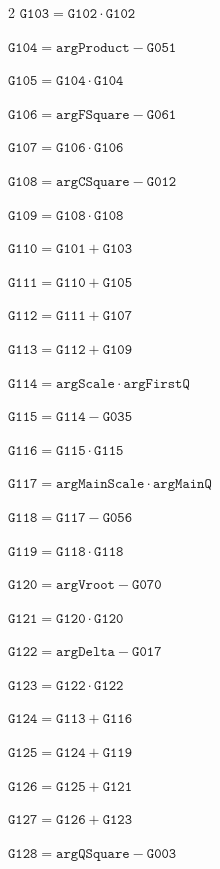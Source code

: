 \documentclass[10pt]{article}
\begin{document}
\begin{multicols}{2}
\noindent $\mathtt{G103}=\mathtt{G102}\cdot \mathtt{G102}$\par
\noindent $\mathtt{G104}=\mathtt{argProduct}-\mathtt{G051}$\par
\noindent $\mathtt{G105}=\mathtt{G104}\cdot \mathtt{G104}$\par
\noindent $\mathtt{G106}=\mathtt{argFSquare}-\mathtt{G061}$\par
\noindent $\mathtt{G107}=\mathtt{G106}\cdot \mathtt{G106}$\par
\noindent $\mathtt{G108}=\mathtt{argCSquare}-\mathtt{G012}$\par
\noindent $\mathtt{G109}=\mathtt{G108}\cdot \mathtt{G108}$\par
\noindent $\mathtt{G110}=\mathtt{G101}+\mathtt{G103}$\par
\noindent $\mathtt{G111}=\mathtt{G110}+\mathtt{G105}$\par
\noindent $\mathtt{G112}=\mathtt{G111}+\mathtt{G107}$\par
\noindent $\mathtt{G113}=\mathtt{G112}+\mathtt{G109}$\par
\noindent $\mathtt{G114}=\mathtt{argScale}\cdot \mathtt{argFirstQ}$\par
\noindent $\mathtt{G115}=\mathtt{G114}-\mathtt{G035}$\par
\noindent $\mathtt{G116}=\mathtt{G115}\cdot \mathtt{G115}$\par
\noindent $\mathtt{G117}=\mathtt{argMainScale}\cdot \mathtt{argMainQ}$\par
\noindent $\mathtt{G118}=\mathtt{G117}-\mathtt{G056}$\par
\noindent $\mathtt{G119}=\mathtt{G118}\cdot \mathtt{G118}$\par
\noindent $\mathtt{G120}=\mathtt{argVroot}-\mathtt{G070}$\par
\noindent $\mathtt{G121}=\mathtt{G120}\cdot \mathtt{G120}$\par
\noindent $\mathtt{G122}=\mathtt{argDelta}-\mathtt{G017}$\par
\noindent $\mathtt{G123}=\mathtt{G122}\cdot \mathtt{G122}$\par
\noindent $\mathtt{G124}=\mathtt{G113}+\mathtt{G116}$\par
\noindent $\mathtt{G125}=\mathtt{G124}+\mathtt{G119}$\par
\noindent $\mathtt{G126}=\mathtt{G125}+\mathtt{G121}$\par
\noindent $\mathtt{G127}=\mathtt{G126}+\mathtt{G123}$\par
\noindent $\mathtt{G128}=\mathtt{argQSquare}-\mathtt{G003}$\par

\end{multicols}
\end{document}
